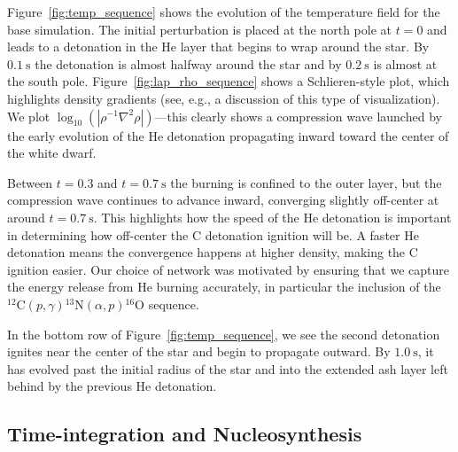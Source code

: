 \documentclass[preprint,linenumbers]{aastex631}
\newcommand{\isotm}[2]{{}^{#2}\mathrm{#1}}
\begin{document}
\begin{figure*}[t]
\centering
{}
\caption{\label{fig:temp_sequence} Time-sequence of the SDC run showing the temperature.}
\end{figure*}

Figure~\ref{fig:temp_sequence} shows the evolution of the temperature field for the base simulation.  The initial perturbation is placed at the north pole at $t=0$ and leads to a detonation in the He layer that begins to wrap around the star.  By $0.1~\mathrm{s}$ the detonation is almost halfway around the star and by $0.2~\mathrm{s}$ is almost at the south pole.  Figure~\ref{fig:lap_rho_sequence} shows a Schlieren-style plot, which
highlights density gradients (see, e.g., \citealt{svakhine:2005} a discussion of
this type of visualization).  We plot
$\log_{10}(|\rho^{-1}\nabla^2\rho|)$---this clearly shows a
compression wave launched by the early evolution of the He detonation propagating inward toward
the center of the white dwarf.  

\begin{figure*}[t]
\centering
{}
\caption{\label{fig:lap_rho_sequence} Time-sequence of the SDC run showing the compression.}
\end{figure*}

Between $t = 0.3$ and $t = 0.7~\mathrm{s}$ the burning is confined to
the outer layer, but the compression wave continues to advance inward,
converging slightly off-center at around $t = 0.7~\mathrm{s}$.  This
highlights how the speed of the He detonation is important in
determining how off-center the C detonation ignition will be.  
A faster He detonation means the convergence happens
at higher density, making the C ignition easier.
Our
choice of network was motivated by ensuring that we capture the energy
release from He burning accurately, in particular the inclusion of the
$\isotm{C}{12}(p,\gamma)\isotm{N}{13}(\alpha,p)\isotm{O}{16}$
sequence.

In the bottom row of Figure~\ref{fig:temp_sequence}, we see
the second detonation ignites near the center of the star and
begin to propagate outward.  By $1.0~\mathrm{s}$, it has evolved
past the initial radius of the star and into the extended
ash layer left behind by the previous He detonation.

\subsection{Time-integration and Nucleosynthesis}
\end{document}
